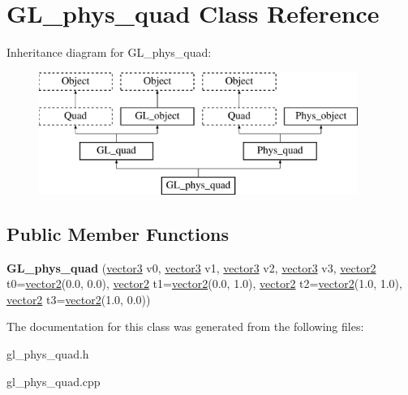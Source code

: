 \hypertarget{class_g_l__phys__quad}{
\section{GL\_\-phys\_\-quad Class Reference}
\label{class_g_l__phys__quad}
}
Inheritance diagram for GL\_\-phys\_\-quad:\begin{figure}[H]
\begin{center}
\leavevmode
\includegraphics[height=4.000000cm]{class_g_l__phys__quad}
\end{center}
\end{figure}
\subsection*{Public Member Functions}
\begin{DoxyCompactItemize}
\item 
\hypertarget{class_g_l__phys__quad_adf664ef1ff019c6c1a53010695ee06b2}{
{\bfseries GL\_\-phys\_\-quad} (\hyperlink{classvector3d}{vector3} v0, \hyperlink{classvector3d}{vector3} v1, \hyperlink{classvector3d}{vector3} v2, \hyperlink{classvector3d}{vector3} v3, \hyperlink{classvector2d}{vector2} t0=\hyperlink{classvector2d}{vector2}(0.0, 0.0), \hyperlink{classvector2d}{vector2} t1=\hyperlink{classvector2d}{vector2}(0.0, 1.0), \hyperlink{classvector2d}{vector2} t2=\hyperlink{classvector2d}{vector2}(1.0, 1.0), \hyperlink{classvector2d}{vector2} t3=\hyperlink{classvector2d}{vector2}(1.0, 0.0))}
\label{class_g_l__phys__quad_adf664ef1ff019c6c1a53010695ee06b2}

\end{DoxyCompactItemize}


The documentation for this class was generated from the following files:\begin{DoxyCompactItemize}
\item 
gl\_\-phys\_\-quad.h\item 
gl\_\-phys\_\-quad.cpp\end{DoxyCompactItemize}
